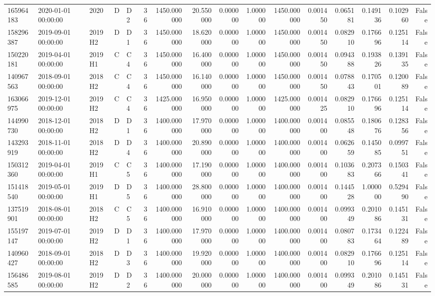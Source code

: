 \begin{tabular}{lllllrrrrrrrrrrr}
165964183 & 2020-01-01 00:00:00 & 2020 & D & D2 & 36 & 1450.000000 & 20.550000 & 0.000000 & 1.000000 & 1450.000000 & 0.001450 & 0.065181 & 0.149136 & 0.102960 & False \\
158296387 & 2019-09-01 00:00:00 & 2019H2 & D & D1 & 36 & 1450.000000 & 18.620000 & 0.000000 & 1.000000 & 1450.000000 & 0.001450 & 0.082910 & 0.176696 & 0.125114 & False \\
150220181 & 2019-04-01 00:00:00 & 2019H1 & C & C4 & 36 & 1450.000000 & 16.400000 & 0.000000 & 1.000000 & 1450.000000 & 0.001450 & 0.094388 & 0.193826 & 0.139135 & False \\
140967563 & 2018-09-01 00:00:00 & 2018H2 & C & C4 & 36 & 1450.000000 & 16.140000 & 0.000000 & 1.000000 & 1450.000000 & 0.001450 & 0.078843 & 0.170501 & 0.120089 & False \\
163066975 & 2019-12-01 00:00:00 & 2019H2 & C & C4 & 36 & 1425.000000 & 16.950000 & 0.000000 & 1.000000 & 1425.000000 & 0.001425 & 0.082910 & 0.176696 & 0.125114 & False \\
144990730 & 2018-12-01 00:00:00 & 2018H2 & D & D1 & 36 & 1400.000000 & 17.970000 & 0.000000 & 1.000000 & 1400.000000 & 0.001400 & 0.085548 & 0.180676 & 0.128356 & False \\
143293919 & 2018-11-01 00:00:00 & 2018H2 & D & D4 & 36 & 1400.000000 & 20.890000 & 0.000000 & 1.000000 & 1400.000000 & 0.001400 & 0.062659 & 0.145085 & 0.099751 & False \\
150312360 & 2019-04-01 00:00:00 & 2019H1 & C & C5 & 36 & 1400.000000 & 17.190000 & 0.000000 & 1.000000 & 1400.000000 & 0.001400 & 0.103683 & 0.207366 & 0.150341 & False \\
151418540 & 2019-05-01 00:00:00 & 2019H1 & D & D5 & 36 & 1400.000000 & 28.800000 & 0.000000 & 1.000000 & 1400.000000 & 0.001400 & 0.144528 & 1.000000 & 0.529490 & False \\
137519901 & 2018-08-01 00:00:00 & 2018H2 & C & C5 & 36 & 1400.000000 & 16.910000 & 0.000000 & 1.000000 & 1400.000000 & 0.001400 & 0.099349 & 0.201086 & 0.145131 & False \\
155197147 & 2019-07-01 00:00:00 & 2019H2 & D & D1 & 36 & 1400.000000 & 17.970000 & 0.000000 & 1.000000 & 1400.000000 & 0.001400 & 0.080783 & 0.173464 & 0.122489 & False \\
140960427 & 2018-09-01 00:00:00 & 2018H2 & D & D3 & 36 & 1400.000000 & 19.920000 & 0.000000 & 1.000000 & 1400.000000 & 0.001400 & 0.082910 & 0.176696 & 0.125114 & False \\
156486585 & 2019-08-01 00:00:00 & 2019H2 & D & D2 & 36 & 1400.000000 & 20.000000 & 0.000000 & 1.000000 & 1400.000000 & 0.001400 & 0.099349 & 0.201086 & 0.145131 & False \\

\end{tabular}
